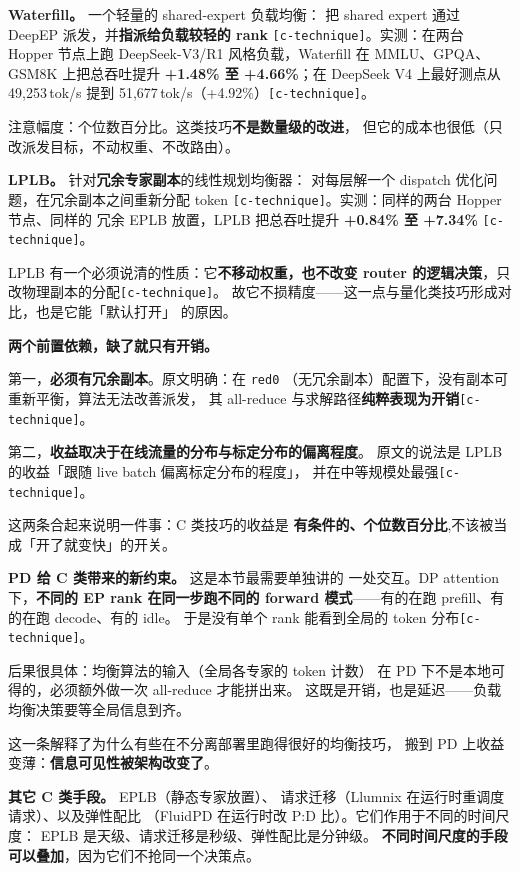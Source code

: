 \noindent\textbf{Waterfill。} 一个轻量的 shared-expert 负载均衡：
把 shared expert 通过 DeepEP 派发，并\textbf{指派给负载较轻的 rank}
\texttt{[c-technique]}。实测：在两台 Hopper 节点上跑 DeepSeek-V3/R1
风格负载，Waterfill 在 MMLU、GPQA、GSM8K 上把总吞吐提升
\textbf{+1.48\% 至 +4.66\%}；在 DeepSeek V4 上最好测点从
49{,}253\,tok/s 提到 51{,}677\,tok/s（+4.92\%）\texttt{[c-technique]}。

\noindent 注意幅度：个位数百分比。这类技巧\textbf{不是数量级的改进}，
但它的成本也很低（只改派发目标，不动权重、不改路由）。

\noindent\textbf{LPLB。} 针对\textbf{冗余专家副本}的线性规划均衡器：
对每层解一个 dispatch 优化问题，在冗余副本之间重新分配 token
\texttt{[c-technique]}。实测：同样的两台 Hopper 节点、同样的
冗余 EPLB 放置，LPLB 把总吞吐提升 \textbf{+0.84\% 至 +7.34\%}
\texttt{[c-technique]}。

\noindent LPLB 有一个必须说清的性质：它\textbf{不移动权重，也不改变
router 的逻辑决策}，只改物理副本的分配\texttt{[c-technique]}。
故它不损精度——这一点与量化类技巧形成对比，也是它能「默认打开」
的原因。

\noindent\textbf{两个前置依赖，缺了就只有开销。}

第一，\textbf{必须有冗余副本}。原文明确：在 \texttt{red0}
（无冗余副本）配置下，没有副本可重新平衡，算法无法改善派发，
其 all-reduce 与求解路径\textbf{纯粹表现为开销}\texttt{[c-technique]}。

第二，\textbf{收益取决于在线流量的分布与标定分布的偏离程度}。
原文的说法是 LPLB 的收益「跟随 live batch 偏离标定分布的程度」，
并在中等规模处最强\texttt{[c-technique]}。

\noindent 这两条合起来说明一件事：C 类技巧的收益是
\textbf{有条件的、个位数百分比},不该被当成「开了就变快」的开关。

\noindent\textbf{PD 给 C 类带来的新约束。} 这是本节最需要单独讲的
一处交互。DP attention 下，\textbf{不同的 EP rank 在同一步跑不同的
forward 模式}——有的在跑 prefill、有的在跑 decode、有的 idle。
于是没有单个 rank 能看到全局的 token 分布\texttt{[c-technique]}。

\noindent 后果很具体：均衡算法的输入（全局各专家的 token 计数）
在 PD 下不是本地可得的，必须额外做一次 all-reduce 才能拼出来。
这既是开销，也是延迟——负载均衡决策要等全局信息到齐。

\noindent 这一条解释了为什么有些在不分离部署里跑得很好的均衡技巧，
搬到 PD 上收益变薄：\textbf{信息可见性被架构改变了}。

\noindent\textbf{其它 C 类手段。} EPLB（静态专家放置）、
请求迁移（Llumnix 在运行时重调度请求）、以及弹性配比
（FluidPD 在运行时改 P:D 比）。它们作用于不同的时间尺度：
EPLB 是天级、请求迁移是秒级、弹性配比是分钟级。
\textbf{不同时间尺度的手段可以叠加}，因为它们不抢同一个决策点。

